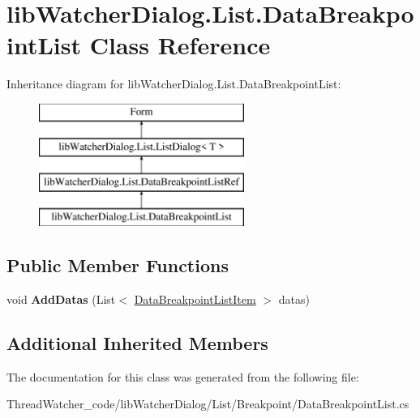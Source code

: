 \hypertarget{classlib_watcher_dialog_1_1_list_1_1_data_breakpoint_list}{\section{lib\+Watcher\+Dialog.\+List.\+Data\+Breakpoint\+List Class Reference}
\label{classlib_watcher_dialog_1_1_list_1_1_data_breakpoint_list}
}
Inheritance diagram for lib\+Watcher\+Dialog.\+List.\+Data\+Breakpoint\+List\+:\begin{figure}[H]
\begin{center}
\leavevmode
\includegraphics[height=4.000000cm]{classlib_watcher_dialog_1_1_list_1_1_data_breakpoint_list}
\end{center}
\end{figure}
\subsection*{Public Member Functions}
\begin{DoxyCompactItemize}
\item 
\hypertarget{classlib_watcher_dialog_1_1_list_1_1_data_breakpoint_list_a0ef364b71e1546d6a7ce9021ce34d31b}{void {\bfseries Add\+Datas} (List$<$ \hyperlink{classlib_watcher_dialog_1_1_list_1_1_data_breakpoint_list_item}{Data\+Breakpoint\+List\+Item} $>$ datas)}\label{classlib_watcher_dialog_1_1_list_1_1_data_breakpoint_list_a0ef364b71e1546d6a7ce9021ce34d31b}

\end{DoxyCompactItemize}
\subsection*{Additional Inherited Members}


The documentation for this class was generated from the following file\+:\begin{DoxyCompactItemize}
\item 
Thread\+Watcher\+\_\+code/lib\+Watcher\+Dialog/\+List/\+Breakpoint/Data\+Breakpoint\+List.\+cs\end{DoxyCompactItemize}
